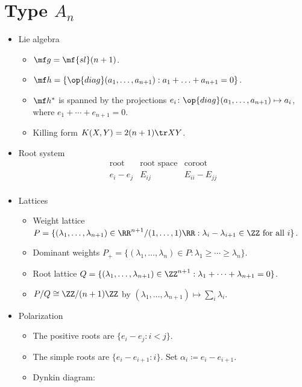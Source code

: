 \documentclass{article}
\begin{document}
\newpage
\appendix

\section{Type \texorpdfstring{$A_n$}{An}}
\begin{itemize}
	\item Lie algebra
	\begin{itemize}
		\item $\mf g=\mf{sl}(n+1)$.
		\item $\mf h=\{\op{diag}(a_1,\ldots,a_{n+1}):a_1+\ldots+a_{n+1}=0\}$.
		\item $\mf h^*$ is spanned by the projections $e_i\colon\op{diag}(a_1,\ldots,a_{n+1})\mapsto a_i$, where $e_1+\cdots+e_{n+1}=0$.
		\item Killing form $K(X,Y)=2(n+1)\tr XY$.
	\end{itemize}
	\item Root system
	\[\begin{array}{c|cccccc}
		\text{root} & \text{root space} & \text{coroot} \\\hline
		e_i-e_j & E_{ij} & E_{ii}-E_{jj}\\
	\end{array}\]
	\item Lattices
	\begin{itemize}
		\item Weight lattice $P=\{(\lambda_1,\ldots,\lambda_{n+1})\in\RR^{n+1}/(1,\ldots,1)\RR:\lambda_i-\lambda_{i+1}\in\ZZ\text{ for all }i\}$.
		\item Dominant weights $P_+=\{(\lambda_1,\ldots,\lambda_n)\in P:\lambda_1\ge\cdots\ge\lambda_n\}$.
		\item Root lattice $Q=\{(\lambda_1,\ldots,\lambda_{n+1})\in\ZZ^{n+1}:\lambda_1+\cdots+\lambda_{n+1}=0\}$.
		\item $P/Q\cong\ZZ/(n+1)\ZZ$ by $(\lambda_1,\ldots,\lambda_{n+1})\mapsto\sum_i\lambda_i$.
	\end{itemize}
	\item Polarization
	\begin{itemize}
		\item The positive roots are $\{e_i-e_j:i<j\}$.
		\item The simple roots are $\{e_i-e_{i+1}:i\}$. Set $\alpha_i\coloneqq e_i-e_{i+1}$.
		\item Dynkin diagram:

\end{itemize}
\end{itemize}
\end{document}
